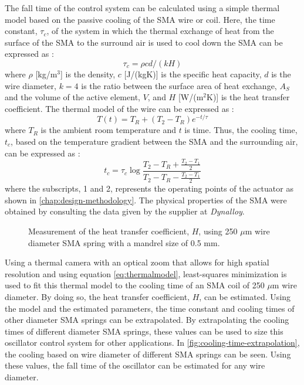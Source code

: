 The fall time of the control system can be calculated using a simple thermal model based on the passive cooling of the SMA wire or coil. Here, the time constant, $\tau_c$, of the system in which the thermal exchange of heat from the surface of the SMA to the surround air is used to cool down the SMA can be expressed as :
\begin{equation}\label{eq:tau}
  \tau_c = \rho cd/(kH)
\end{equation}
where $\rho$ [kg/m$^3$] is the density, $c$ [J/(kgK)] is the specific heat capacity, $d$ is the wire diameter, $k = 4$ is the ratio between the surface area of heat exchange, $A_S$ and the volume of the active element, $V$, and $H$ [W/(m$^2$K)] is the heat transfer coefficient. The thermal model of the wire can be expressed as :
\begin{equation}\label{eq:thermalmodel}
  T(t) = T_R + (T_2-T_R)e^{-t/\tau}
\end{equation}
where $T_R$ is the ambient room temperature and $t$ is time. Thus, the cooling time, $t_c$, based on the temperature gradient between the SMA and the surrounding air, can be expressed as :
\begin{equation}\label{eq:coolingtime}
  t_c = \tau_c\log{\frac{T_2-T_R+\frac{T_2-T_1}{2}}{T_2-T_R-\frac{T_2-T_1}{2}}}
\end{equation}
where the subscripts, 1 and 2, represents the operating points of the actuator as shown in \cref{chap:design-methodology}. The physical properties of the SMA were obtained by consulting the data given by the supplier at \textit{Dynalloy}.

\begin{figure}[htb!] %
  \centering
  \resizebox{0.8\textwidth}{!}{}
  \caption{Measurement of the heat transfer coefficient, $H$, using 250 $\mu$m wire diameter SMA spring with a mandrel size of 0.5 mm.}
  \label{fig:thermal-fitting}
\end{figure}

Using a thermal camera with an optical zoom that allows for high spatial resolution and using equation \ref{eq:thermalmodel}, least-squares minimization is used to fit this thermal model to the cooling time of an SMA coil of 250 $\mu$m wire diameter. By doing so, the heat transfer coefficient, $H$, can be estimated. Using the model and the estimated parameters, the time constant and cooling times of other diameter SMA springs can be extrapolated. By extrapolating the cooling times of different diameter SMA springs, these values can be used to size this oscillator control system for other applications. In \cref{fig:cooling-time-extrapolation}, the cooling based on wire diameter of different SMA springs can be seen. Using these values, the fall time of the oscillator can be estimated for any wire diameter.

